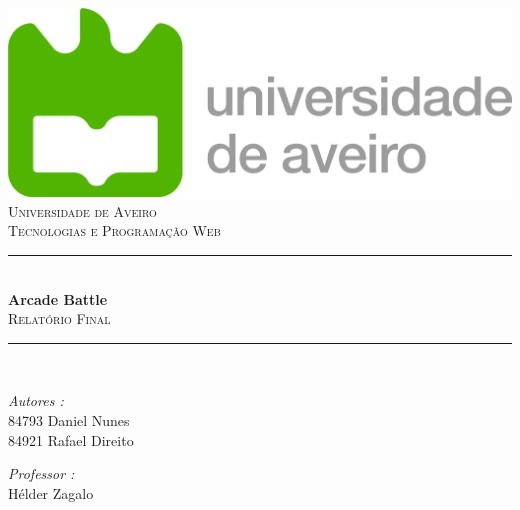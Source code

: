 \documentclass[12pt]{article}
\date{\today}											%
\makeatletter
\let\thedate\@date
\makeatother
\begin{document}

\begin{titlepage}
	\centering
    \vspace*{0.5 cm}
    \includegraphics[scale = 0.6]{img/logo_UA.png}\\[1.0 cm]	%
    \textsc{\LARGE Universidade de Aveiro }\\[2.0 cm]
	\textsc{\Large Tecnologias e Programação Web}\\[0.5 cm]
	\rule{\linewidth}{0.2 mm} \\[0.4 cm]
	{ \huge \bfseries {Arcade Battle}}\\[0.5 cm]
	\textsc{\Large Relatório Final}\\	
	\rule{\linewidth}{0.2 mm} \\[1.5 cm]
	
	\begin{minipage}{0.4\textwidth}
		\begin{flushleft} \large
			\emph{Autores :}\\
			{84793 \quad Daniel Nunes}\\	
			{84921 \quad Rafael Direito}	
	    \end{flushleft}
	\end{minipage}
	\begin{minipage}{0.4\textwidth}
		\begin{flushright} \large
			\emph{Professor :} \\
			{Hélder Zagalo}
		\end{flushright}
	\end{minipage}\\[2 cm]
	
	\vspace*{\fill}
	{\large \thedate}
 
	\vfill
	
\end{titlepage}

\end{document}
